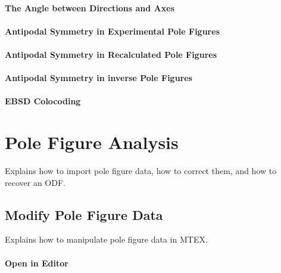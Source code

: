 \documentclass{article}
\begin{document}
			\paragraph{The Angle between Directions and Axes}
		
			\paragraph{Antipodal Symmetry in Experimental Pole Figures}
		
			\paragraph{Antipodal Symmetry in Recalculated Pole Figures}
		
			\paragraph{Antipodal Symmetry in inverse Pole Figures}
		
			\paragraph{EBSD Colocoding}
		
		\section{Pole Figure Analysis}

		
                  \begin{par}
Explains how to import pole figure data, how to correct them, and how to recover an ODF.
\end{par} \vspace{1em}

               
		\subsection{Modify Pole Figure Data}

		
                     \begin{par}
Explains how to manipulate pole figure data in MTEX.
\end{par} \vspace{1em}

                  
			\paragraph{Open in Editor}
		
\end{document}
